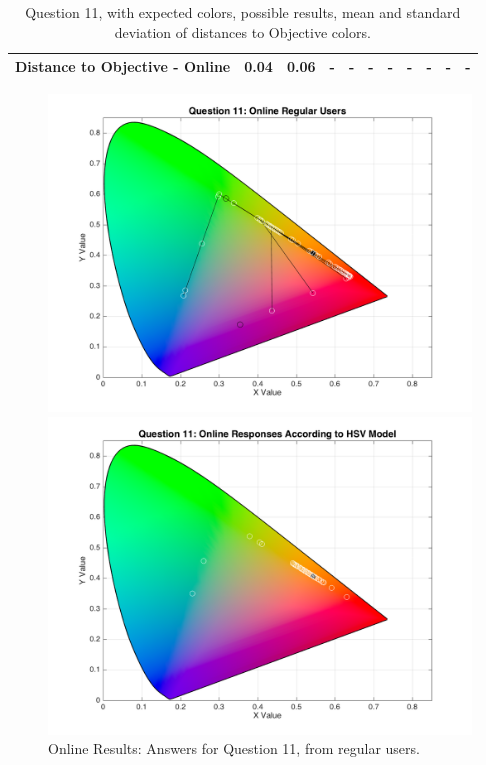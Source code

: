 \begin{table}[H]
{\begin{tabular}{lccccccccccccc}
    \multicolumn{4}{l}{Distance to Objective - Online}                                                                                               & \multicolumn{1}{|c}{0.04}        & \multicolumn{1}{c|}{0.06}    & \multicolumn{1}{|c}{-}        & \multicolumn{1}{c|}{-}    & \multicolumn{1}{|c}{-}       & \multicolumn{1}{c|}{-}    & \multicolumn{1}{|c}{-}        & \multicolumn{1}{c|}{-}    & \multicolumn{1}{|c}{-}       & \multicolumn{1}{c|}{-}    \\ \hline
    \end{tabular}}
  \caption[Question 11, with expected Results.]{Question 11, with expected colors, possible results, mean and standard deviation of distances to Objective colors.}
  \label{table:lab_q11_expected}
\end{table}
%
\begin{figure}[htbp]
  \centering
  \begin{minipage}{0.48\textwidth}
    \centering
    \includegraphics[width=\textwidth]{images/11_online_regularUsers.png}
    \caption[Online Results: Answers for Question 11, from regular users.]{Online Results: Answers for Question 11, from regular users.}
    \label{fig:onlineregular_11}
  \end{minipage}\hfill
  \begin{minipage}{0.48\textwidth}
    \centering
    \includegraphics[width=\textwidth]{images/11_online_HSVresponses.png}

\end{minipage}
\end{figure}
